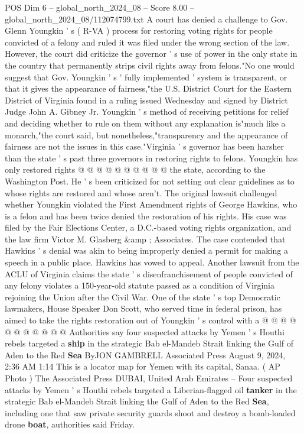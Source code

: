 \begin{textsample}{POS Dim 6 – global\_north\_2024\_08 – Score 8.00 – global\_north\_2024\_08/112074799.txt}  \label{ex:f6_pos_293}
A court has denied a challenge to Gov.
Glenn Youngkin ' s ( R-VA ) process for restoring voting rights for people convicted of a felony and ruled it was filed under the wrong section of the law.
However, the court did criticize the governor ' s use of power in the only state in the country that permanently strips civil rights away from felons."No one would suggest that Gov.
Youngkin ' s ' fully implemented ' system is transparent, or that it gives the appearance of fairness,"the U.S.
District Court for the Eastern District of Virginia found in a ruling issued Wednesday and signed by District Judge John A.
Gibney Jr.
Youngkin ' s method of receiving petitions for relief and deciding whether to rule on them without any explanation is"much like a monarch,"the court said, but nonetheless,"transparency and the appearance of fairness are not the issues in this case."Virginia ' s governor has been harsher than the state ' s past three governors in restoring rights to felons.
Youngkin has only restored rights @ @ @ @ @ @ @ @ @ @ the state, according to the Washington Post.
He ' s been criticized for not setting out clear guidelines as to whose rights are restored and whose aren't.
The original lawsuit challenged whether Youngkin violated the First Amendment rights of George Hawkins, who is a felon and has been twice denied the restoration of his rights.
His case was filed by the Fair Elections Center, a D.C.-based voting rights organization, and the law firm Victor M.
Glasberg \&amp ; Associates.
The case contended that Hawkins ' s denial was akin to being improperly denied a permit for making a speech in a public place.
Hawkins has vowed to appeal.
Another lawsuit from the ACLU of Virginia claims the state ' s disenfranchisement of people convicted of any felony violates a 150-year-old statute passed as a condition of Virginia rejoining the Union after the Civil War.
One of the state ' s top Democratic lawmakers, House Speaker Don Scott, who served time in federal prison, has aimed to take the rights restoration out of Youngkin ' s control with a @ @ @ @ @ @ @ @ @ @ @ Authorities say four suspected attacks by Yemen ' s Houthi rebels targeted a \textbf{ship} in the strategic Bab el-Mandeb Strait linking the Gulf of Aden to the Red \textbf{Sea} ByJON GAMBRELL Associated Press August 9, 2024, 2:36 AM 1:14 This is a locator map for Yemen with its capital, Sanaa. ( AP Photo ) The Associated Press DUBAI, United Arab Emirates -- Four suspected attacks by Yemen ' s Houthi rebels targeted a Liberian-flagged oil \textbf{tanker} in the strategic Bab el-Mandeb Strait linking the Gulf of Aden to the Red \textbf{Sea}, including one that saw private security guards shoot and destroy a bomb-loaded drone \textbf{boat}, authorities said Friday.

\end{textsample}
